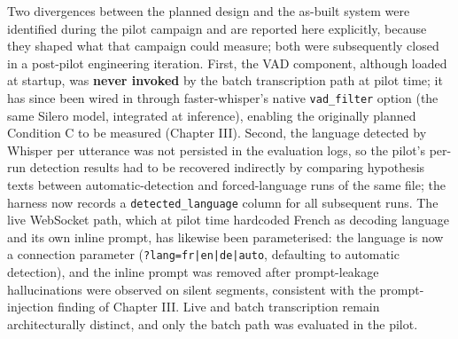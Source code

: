 \documentclass[12pt]{report}
\begin{document}
Two divergences between the planned design and the as-built system were identified during the pilot campaign and are reported here explicitly, because they shaped what that campaign could measure; both were subsequently closed in a post-pilot engineering iteration. First, the VAD component, although loaded at startup, was \textbf{never invoked} by the batch transcription path at pilot time; it has since been wired in through faster-whisper's native \texttt{vad\_filter} option (the same Silero model, integrated at inference), enabling the originally planned Condition C to be measured (Chapter III). Second, the language detected by Whisper per utterance was not persisted in the evaluation logs, so the pilot's per-run detection results had to be recovered indirectly by comparing hypothesis texts between automatic-detection and forced-language runs of the same file; the harness now records a \texttt{detected\_language} column for all subsequent runs. The live WebSocket path, which at pilot time hardcoded French as decoding language and its own inline prompt, has likewise been parameterised: the language is now a connection parameter (\texttt{?lang=fr|en|de|auto}, defaulting to automatic detection), and the inline prompt was removed after prompt-leakage hallucinations were observed on silent segments, consistent with the prompt-injection finding of Chapter III. Live and batch transcription remain architecturally distinct, and only the batch path was evaluated in the pilot.
\end{document}

